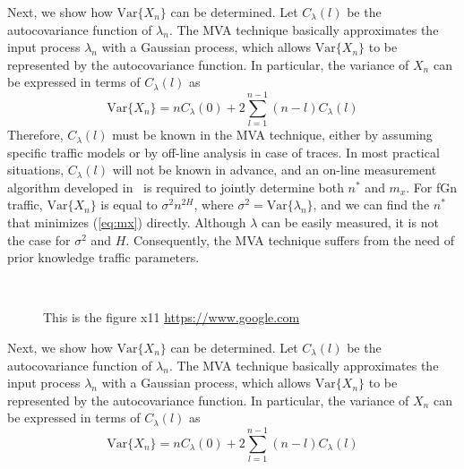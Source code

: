 \documentclass[12pt,oneside,openright,a4paper]{cpe-english-project}
\begin{document}
Next, we show how $\mathrm{Var}\{X_n\}$ can be determined.  Let
$C_{\lambda}(l)$ be the autocovariance function of $\lambda_n$.  The
MVA technique basically approximates the input process $\lambda_n$
with a Gaussian process, which allows $\mathrm{Var}\{X_n\}$ to be
represented by the autocovariance function.  In particular, the
variance of $X_n$ can be expressed in terms of $C_{\lambda}(l)$ as
\begin{equation}
  \mathrm{Var}\{X_n\} = nC_{\lambda}(0) + 2\sum_{l=1}^{n-1} (n-l)C_{\lambda}(l)
\end{equation} 
Therefore, $C_{\lambda}(l)$ must be known in the MVA technique, either
by assuming specific traffic models or by off-line analysis in case of
traces.  In most practical situations, $C_{\lambda}(l)$ will not be
known in advance, and an on-line measurement algorithm developed
in~\cite{eun01} is required to jointly determine both $n^\ast$ and
$m_x$. For fGn traffic, $\mathrm{Var}\{X_n\}$ is equal to $\sigma^2
n^{2H}$, where $\sigma^2 = \mathrm{Var}\{\lambda_n\}$, and we can find
the $n^\ast$ that minimizes (\ref{eq:mx}) directly. Although $\lambda$
can be easily measured, it is not the case for $\sigma^2$ and $H$.
Consequently, the MVA technique suffers from the need of prior
knowledge traffic parameters.


 \\


 \begin{figure}[!h]
\caption{This is the figure x11 \href{https://www.google.com} {https://www.google.com}}\label{fig:x1}
\end{figure}

Next, we show how $\mathrm{Var}\{X_n\}$ can be determined.  Let
$C_{\lambda}(l)$ be the autocovariance function of $\lambda_n$.  The
MVA technique basically approximates the input process $\lambda_n$
with a Gaussian process, which allows $\mathrm{Var}\{X_n\}$ to be
represented by the autocovariance function.  In particular, the
variance of $X_n$ can be expressed in terms of $C_{\lambda}(l)$ as
\begin{equation}
  \mathrm{Var}\{X_n\} = nC_{\lambda}(0) + 2\sum_{l=1}^{n-1} (n-l)C_{\lambda}(l)
\end{equation} 

 \\
\end{document}

